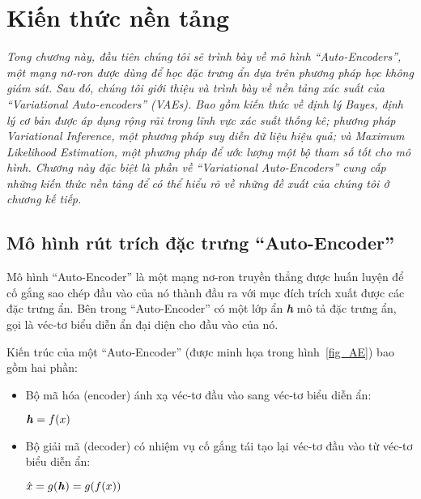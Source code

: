 \chapter{Kiến thức nền tảng}
\label{Chapter2}
\graphicspath{{Chapter2/Chapter2Figs}}

\textit{Tong chương này, đầu tiên chúng tôi sẽ trình bày về mô hình 
``Auto-Encoders'', một mạng nơ-ron được dùng để học đặc trưng ẩn dựa trên
phương pháp học không giám sát.
Sau đó, chúng tôi giới thiệu và trình bày về nền tảng xác suất 
của ``Variational Auto-encoders'' (VAEs). Bao gồm kiến thức về định lý Bayes, định lý cơ bản được áp dụng rộng rãi trong lĩnh vực xác suất thống kê; 
phương pháp Variational Inference, một phương pháp suy diễn dữ liệu hiệu quả; và Maximum Likelihood Estimation, một phương pháp để ước lượng một bộ tham số tốt cho mô hình.
Chương này đặc biệt là phần về ``Variational Auto-Encoders'' 
cung cấp những kiến thức nền tảng để có thể hiểu rõ về những đề xuất 
của chúng tôi ở chương kế tiếp.}



\section{Mô hình rút trích đặc trưng ``Auto-Encoder''}
\label{chap2/sec1}
Mô hình ``Auto-Encoder'' là một mạng nơ-ron truyền thẳng được huấn luyện
để cố gắng sao chép đầu vào của nó thành đầu ra với mục đích trích xuất được các đặc trưng ẩn. Bên trong ``Auto-Encoder''
có một lớp ẩn \textbf{\textit{h}} mô tả đặc trưng ẩn, gọi là véc-tơ biểu diễn ẩn đại diện cho đầu vào của nó.
 
Kiến trúc của một ``Auto-Encoder'' (được minh họa trong hình~\ref{fig_AE}) bao gồm hai phần:
\begin{itemize}
    \item Bộ mã hóa (encoder) ánh xạ véc-tơ đầu vào sang véc-tơ biểu diễn ẩn: 
    \begin{center}
        \begin{math}
            \centering
            \textbf{\textit{h}} = f(x)
        \end{math} 
            
    \end{center}
    \item Bộ giải mã (decoder) có nhiệm vụ cố gắng tái tạo lại véc-tơ đầu vào từ véc-tơ biểu diễn ẩn:
    \begin{center}
        \begin{math}
            \hat{x} = g(\textbf{\textit{h}}) = g(f(x))
        \end{math}
    \end{center}
\end{itemize}

